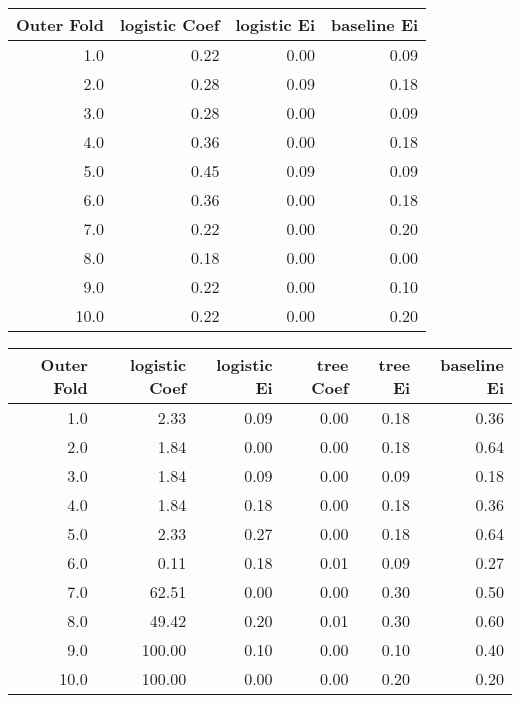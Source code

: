 \begin{tabular}{rrrr}
\toprule
 Outer Fold &  logistic Coef &  logistic Ei &  baseline Ei \\
\midrule
        1.0 &           0.22 &         0.00 &         0.09 \\
        2.0 &           0.28 &         0.09 &         0.18 \\
        3.0 &           0.28 &         0.00 &         0.09 \\
        4.0 &           0.36 &         0.00 &         0.18 \\
        5.0 &           0.45 &         0.09 &         0.09 \\
        6.0 &           0.36 &         0.00 &         0.18 \\
        7.0 &           0.22 &         0.00 &         0.20 \\
        8.0 &           0.18 &         0.00 &         0.00 \\
        9.0 &           0.22 &         0.00 &         0.10 \\
       10.0 &           0.22 &         0.00 &         0.20 \\
\bottomrule
\end{tabular}


\begin{tabular}{rrrrrr}
\toprule
 Outer Fold &  logistic Coef &  logistic Ei &  tree Coef &  tree Ei &  baseline Ei \\
\midrule
        1.0 &           2.33 &         0.09 &       0.00 &     0.18 &         0.36 \\
        2.0 &           1.84 &         0.00 &       0.00 &     0.18 &         0.64 \\
        3.0 &           1.84 &         0.09 &       0.00 &     0.09 &         0.18 \\
        4.0 &           1.84 &         0.18 &       0.00 &     0.18 &         0.36 \\
        5.0 &           2.33 &         0.27 &       0.00 &     0.18 &         0.64 \\
        6.0 &           0.11 &         0.18 &       0.01 &     0.09 &         0.27 \\
        7.0 &          62.51 &         0.00 &       0.00 &     0.30 &         0.50 \\
        8.0 &          49.42 &         0.20 &       0.01 &     0.30 &         0.60 \\
        9.0 &         100.00 &         0.10 &       0.00 &     0.10 &         0.40 \\
       10.0 &         100.00 &         0.00 &       0.00 &     0.20 &         0.20 \\
\bottomrule
\end{tabular}


